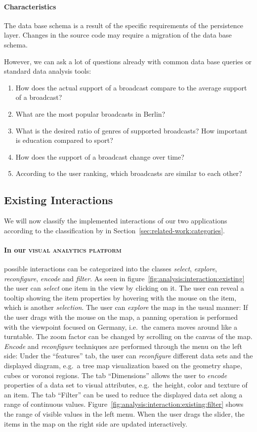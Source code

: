 \documentclass{article}
\newcommand{\visan}{\textsc{visual analytics platform}}
\begin{document}
\paragraph{Characteristics}
The data base schema is a result of the specific requirements of the persistence layer.
Changes in the source code may require a migration of the data base schema.

However, we can ask a lot of questions already with common data base queries or standard data analysis tools:
\begin{enumerate}
  \item
    How does the actual support of a broadcast compare to the average support of a broadcast?
  \item
    What are the most popular broadcasts in Berlin?
  \item
    What is the desired ratio of genres of supported broadcasts? How important is education compared to sport?
  \item
    How does the support of a broadcast change over time?
  \item
    According to the user ranking, which broadcasts are similar to each other?
\end{enumerate}


\subsection{Existing Interactions}
We will now classify the implemented interactions of our two applications according to the classification by \textcite{Yi2007} in Section~\ref{sec:related-work:categories}.

\paragraph{In our \visan{}} possible interactions can be categorized into the classes \emph{select}, \emph{explore}, \emph{reconfigure}, \emph{encode} and \emph{filter}.
As seen in figure~\ref{fig:analysis:interaction:existing} the user can \emph{select} one item in the view by clicking on it.
The user can reveal a tooltip showing the item properties by hovering with the mouse on the item, which is another \emph{selection}.
The user can \emph{explore} the map in the usual manner:
If the user drags with the mouse on the map, a panning operation is performed with the viewpoint focused on Germany, i.e.\ the camera moves around like a turntable.
The zoom factor can be changed by scrolling on the canvas of the map.
\emph{Encode} and \emph{reconfigure} techniques are performed through the menu on the left side:
Under the ``features'' tab, the user can \emph{reconfigure} different data sets and the displayed diagram, e.g.\ a tree map visualization based on the geometry shape, cubes or voronoi regions.
The tab ``Dimensions'' allows the user to \emph{encode} properties of a data set to visual attributes, e.g.\ the height, color and texture of an item.
The tab ``Filter'' can be used to reduce the displayed data set along a range of continuous values.
Figure~\ref{fig:analysis:interaction:existing:filter} shows the range of visible values in the left menu.
When the user drags the slider, the items in the map on the right side are updated interactively.
\end{document}
